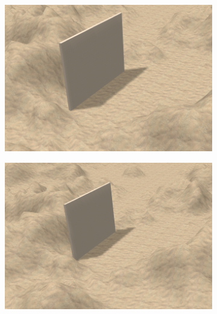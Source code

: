 \begin{figure}[H]
    \centering
    \begin{subfigure}[t]{0.328\textwidth}
        \includegraphics[width=\textwidth]{dados/figuras/scene3.png}
        \caption{}
        \label{fig:scene2}
    \end{subfigure}
    \begin{subfigure}[t]{0.328\textwidth}
        \includegraphics[width=\textwidth]{dados/figuras/scene2.png}
        \caption{}
        \label{fig:scene1}
    \end{subfigure}
    \begin{subfigure}[t]{0.328\textwidth}

\end{subfigure}
\end{figure}
